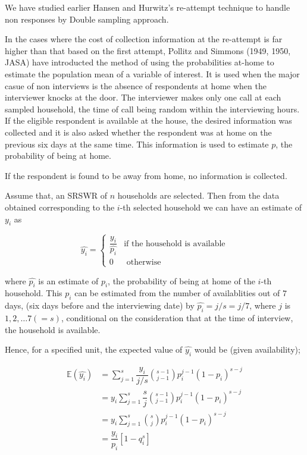 \documentclass[12pt]{article}
\newcommand{\E}{\mathbb{E}}
\theoremstyle{definition}
\begin{document}
We have studied earlier Hansen and Hurwitz's re-attempt technique to handle non responses by Double sampling approach.

In the cases where the cost of collection information at the re-attempt is far higher than that based on the first attempt, Pollitz and Simmons (1949, 1950, JASA) have introducted the method of using the probabilities at-home to estimate the population mean of a variable of interest. It is used when the major casue of non interviews is the absence of respondents at home when the interviewer knocks at the door. The interviewer makes only one call at each sampled household, the time of call being random within the interviewing hours. If the eligible respondent is available at the house, the desired information was collected and it is also asked whether the respondent was at home on the previous six days at the same time. This information is used to estimate $p$, the probability of being at home.

If the respondent is found to be away from home, no information is collected.

Assume that, an SRSWR of $n$ households are selected. Then from the data obtained corresponding to the $i$-th selected household we can have an estimate of $y_i$ as 

$$\widehat{y_i} = \begin{cases}
    \dfrac{y_i}{\widehat{p_i}} & \text{if the household is available}\\
    0 & \text{ otherwise}
\end{cases}
$$

where $\widehat{p_i}$ is an estimate of $p_i$, the probability of being at home of the $i$-th household. This $p_i$ can be estimated from the number of availablities out of $7$ days, (six days before and the interviewing date) by $\widehat{p_i} = j/s = j/7$, where $j$ is $1, 2, \dots 7 (=s)$, conditional on the consideration that at the time of interview, the household is available.

Hence, for a specified unit, the expected value of $\widehat{y_i}$ would be (given availability);

\begin{align*}
    \E(\widehat{y_i})
    & = \sum_{j = 1}^{s} \dfrac{y_i}{j/s} \binom{s-1}{j-1} p_i^{j-1} (1 - p_i)^{s-j}\\
    & = y_i \sum_{j = 1}^{s} \dfrac{s}{j} \binom{s-1}{j-1} p_i^{j-1} (1 - p_i)^{s-j}\\
    & = y_i \sum_{j = 1}^{s} \binom{s}{j} p_i^{j-1} (1 - p_i)^{s-j}\\
    & = \dfrac{y_i}{p_i} \left[ 1 - q_i^s \right]
\end{align*}
\end{document}
